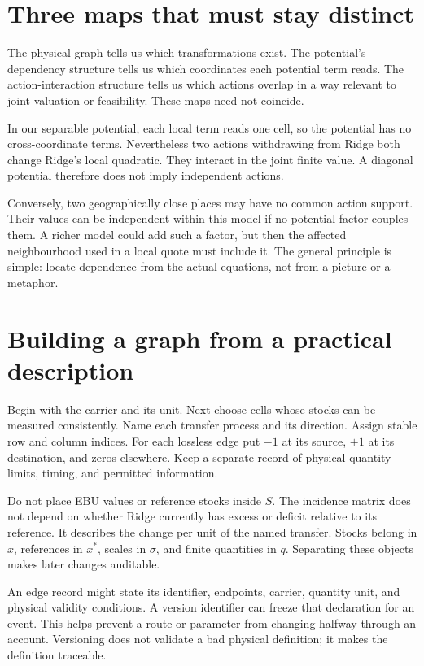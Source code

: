 \section{Three maps that must stay distinct}
The physical graph tells us which transformations exist. The potential's dependency structure tells us which coordinates each potential term reads. The action-interaction structure tells us which actions overlap in a way relevant to joint valuation or feasibility. These maps need not coincide.

In our separable potential, each local term reads one cell, so the potential has no cross-coordinate terms. Nevertheless two actions withdrawing from Ridge both change Ridge's local quadratic. They interact in the joint finite value. A diagonal potential therefore does not imply independent actions.

Conversely, two geographically close places may have no common action support. Their values can be independent within this model if no potential factor couples them. A richer model could add such a factor, but then the affected neighbourhood used in a local quote must include it. The general principle is simple: locate dependence from the actual equations, not from a picture or a metaphor.

\section{Building a graph from a practical description}
Begin with the carrier and its unit. Next choose cells whose stocks can be measured consistently. Name each transfer process and its direction. Assign stable row and column indices. For each lossless edge put \(-1\) at its source, \(+1\) at its destination, and zeros elsewhere. Keep a separate record of physical quantity limits, timing, and permitted information.

Do not place EBU values or reference stocks inside \(S\). The incidence matrix does not depend on whether Ridge currently has excess or deficit relative to its reference. It describes the change per unit of the named transfer. Stocks belong in \(x\), references in \(x^*\), scales in \(\sigma\), and finite quantities in \(q\). Separating these objects makes later changes auditable.

An edge record might state its identifier, endpoints, carrier, quantity unit, and physical validity conditions. A version identifier can freeze that declaration for an event. This helps prevent a route or parameter from changing halfway through an account. Versioning does not validate a bad physical definition; it makes the definition traceable.

